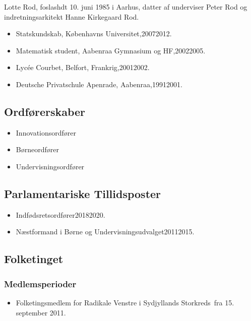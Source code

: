 \documentclass[11pt, a4paper]{awesome-cv}
\begin{document}
\makecvheader[R]
\makelettertitle
\begin{cvletter}
Lotte Rod, foslashdt 10. juni 1985 i Aarhus, datter af underviser Peter Rod og indretningsarkitekt Hanne Kirkegaard Rod.

\begin{itemize}
\item Statskundskab, Københavns Universitet,20072012.
\item Matematisk student, Aabenraa Gymnasium og HF,20022005.
\item Lycée Courbet, Belfort, Frankrig,20012002.
\item Deutsche Privatschule Apenrade, Aabenraa,19912001.
\end{itemize}
\subsection*{Ordførerskaber}
\begin{itemize}
\item Innovationsordfører
\item Børneordfører
\item Undervisningsordfører
\end{itemize}
\subsection*{Parlamentariske Tillidsposter}
\begin{itemize}
\item Indfødsretsordfører20182020.
\item Næstformand i Børne og Undervisningsudvalget20112015.
\end{itemize}
\subsection*{Folketinget}
\subsubsection*{Medlemsperioder}
\begin{itemize}
\item Folketingsmedlem for Radikale Venstre i Sydjyllands Storkreds fra 15. september 2011.
\end{itemize}

\end{cvletter}
\end{document}
